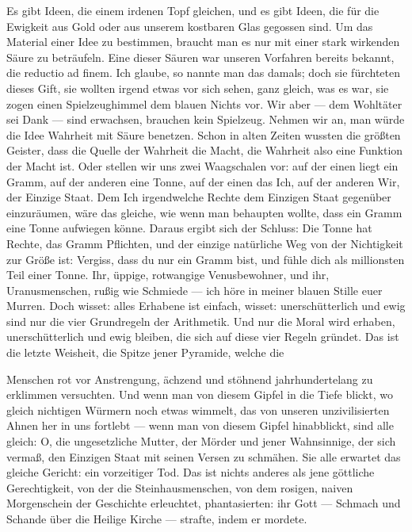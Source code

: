Es gibt Ideen, die einem irdenen Topf gleichen, und es gibt Ideen,
die für die Ewigkeit aus Gold oder aus unserem kostbaren Glas
gegossen sind. Um das Material einer Idee zu bestimmen, braucht man
es nur mit einer stark wirkenden Säure zu beträufeln. Eine dieser
Säuren war unseren Vorfahren bereits bekannt, die reductio ad
finem. Ich glaube, so nannte man das damals; doch sie fürchteten
dieses Gift, sie wollten irgend etwas vor sich sehen, ganz gleich,
was es war, sie zogen einen Spielzeughimmel dem blauen Nichts vor.
Wir aber — dem Wohltäter sei Dank — sind erwachsen, brauchen kein
Spielzeug. Nehmen wir an, man würde die Idee Wahrheit mit Säure
benetzen. Schon in alten Zeiten wussten die größten Geister, dass
die Quelle der Wahrheit die Macht, die Wahrheit also eine Funktion
der Macht ist. Oder stellen wir uns zwei Waagschalen vor: auf der
einen liegt ein Gramm, auf der anderen eine Tonne, auf der einen
das Ich, auf der anderen Wir, der Einzige Staat. Dem Ich
irgendwelche Rechte dem Einzigen Staat gegenüber einzuräumen, wäre
das gleiche, wie wenn man behaupten wollte, dass ein Gramm eine
Tonne aufwiegen könne. Daraus ergibt sich der Schluss: Die Tonne
hat Rechte, das Gramm Pflichten, und der einzige natürliche Weg von
der Nichtigkeit zur Größe ist: Vergiss, dass du nur ein Gramm bist,
und fühle dich als millionsten Teil einer Tonne. Ihr, üppige,
rotwangige Venusbewohner, und ihr, Uranusmenschen, rußig wie
Schmiede — ich höre in meiner blauen Stille euer Murren. Doch
wisset: alles Erhabene ist einfach, wisset: unerschütterlich und
ewig sind nur die vier Grundregeln der Arithmetik. Und nur die
Moral wird erhaben, unerschütterlich und ewig bleiben, die sich auf
diese vier Regeln gründet. Das ist die letzte Weisheit, die Spitze
jener Pyramide, welche die

Menschen rot vor Anstrengung, ächzend und stöhnend jahrhundertelang
zu erklimmen versuchten. Und wenn man von diesem Gipfel in die
Tiefe blickt, wo gleich nichtigen Würmern noch etwas wimmelt, das
von unseren unzivilisierten Ahnen her in uns fortlebt — wenn man
von diesem Gipfel hinabblickt, sind alle gleich: O, die
ungesetzliche Mutter, der Mörder und jener Wahnsinnige, der sich
vermaß, den Einzigen Staat mit seinen Versen zu schmähen. Sie alle
erwartet das gleiche Gericht: ein vorzeitiger Tod. Das ist nichts
anderes als jene göttliche Gerechtigkeit, von der die
Steinhausmenschen, von dem rosigen, naiven Morgenschein der
Geschichte erleuchtet, phantasierten: ihr Gott — Schmach und
Schande über die Heilige Kirche — strafte, indem er mordete.


